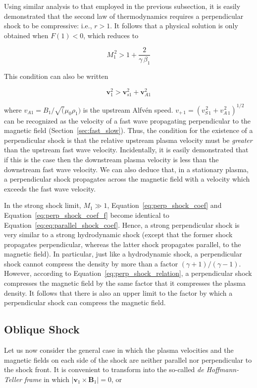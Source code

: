 \documentclass[
  notoc %
]{tufte-book}
\begin{document}
Using similar analysis to that employed in the previous subsection, it
is easily demonstrated that the second law of thermodynamics requires a
perpendicular shock to be compressive: i.e., \(r>1\). It follows that a
physical solution is only obtained when \(F(1)<0\), which reduces to

\[
M_1^{\,2} > 1 + \frac{2}{\gamma\,\beta_1}
\]

This condition can also be written

\[
\mathbf{v}_1^2 > \mathbf{v}_{s1}^2 + \mathbf{v}_{A1}^2
\]

where \(v_{A1} = B_1/\sqrt(\mu_0 \rho_1)\) is the upstream Alfvén speed.
\(v_{+\,1} = (v_{S\,1}^{\,2} + v_{A\,1}^{\,2})^{1/2}\) can be recognized
as the velocity of a fast wave propagating perpendicular to the magnetic
field (Section~\ref{sec:fast_slow}). Thus, the condition for the
existence of a perpendicular shock is that the relative upstream plasma
velocity must be \emph{greater} than the upstream fast wave velocity.
Incidentally, it is easily demonstrated that if this is the case then
the downstream plasma velocity is less than the downstream fast wave
velocity. We can also deduce that, in a stationary plasma, a
perpendicular shock propagates across the magnetic field with a velocity
which exceeds the fast wave velocity.

In the strong shock limit, \(M_1\gg 1\),
Equation~\ref{eq:perp_shock_coef} and
Equation~\ref{eq:perp_shock_coef_f} become identical to
Equation~\ref{eq:eq:parallel_shock_coef}. Hence, a strong perpendicular
shock is very similar to a strong hydrodynamic shock (except that the
former shock propagates perpendicular, whereas the latter shock
propagates parallel, to the magnetic field). In particular, just like a
hydrodynamic shock, a perpendicular shock cannot compress the density by
more than a factor \((\gamma+1)/(\gamma-1)\). However, according to
Equation~\ref{eq:perp_shock_relation}, a perpendicular shock compresses
the magnetic field by the same factor that it compresses the plasma
density. It follows that there is also an upper limit to the factor by
which a perpendicular shock can compress the magnetic field.

\hypertarget{oblique-shock}{%
\subsection{Oblique Shock}\label{oblique-shock}}

Let us now consider the general case in which the plasma velocities and
the magnetic fields on each side of the shock are neither parallel nor
perpendicular to the shock front. It is convenient to transform into the
so-called \emph{de Hoffmann-Teller frame} in which
\(|\mathbf{v}_1\times \mathbf{B}_1|=0\), or
\end{document}
